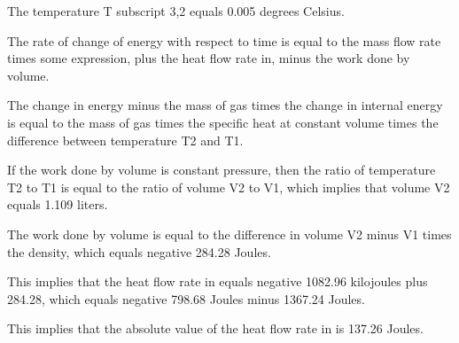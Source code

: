 The temperature T subscript 3,2 equals 0.005 degrees Celsius.

The rate of change of energy with respect to time is equal to the mass flow rate times some expression, plus the heat flow rate in, minus the work done by volume.

The change in energy minus the mass of gas times the change in internal energy is equal to the mass of gas times the specific heat at constant volume times the difference between temperature T2 and T1.

If the work done by volume is constant pressure, then the ratio of temperature T2 to T1 is equal to the ratio of volume V2 to V1, which implies that volume V2 equals 1.109 liters.

The work done by volume is equal to the difference in volume V2 minus V1 times the density, which equals negative 284.28 Joules.

This implies that the heat flow rate in equals negative 1082.96 kilojoules plus 284.28, which equals negative 798.68 Joules minus 1367.24 Joules.

This implies that the absolute value of the heat flow rate in is 137.26 Joules.